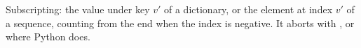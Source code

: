 Subscripting: the value under key $v'$ of a dictionary, or the element at index $v'$ of a sequence,
counting from the end when the index is negative. It aborts with ,
 or  where Python does.
